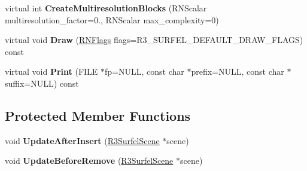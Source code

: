 \begin{DoxyCompactItemize}
\item 
virtual int {\bfseries Create\+Multiresolution\+Blocks} (R\+N\+Scalar multiresolution\+\_\+factor=0., R\+N\+Scalar max\+\_\+complexity=0)\hypertarget{class_r3_surfel_tree_a20392a96414cd9f14d7a0f4a10e325b6}{}\label{class_r3_surfel_tree_a20392a96414cd9f14d7a0f4a10e325b6}

\item 
virtual void {\bfseries Draw} (\hyperlink{class_r_n_flags}{R\+N\+Flags} flags=R3\+\_\+\+S\+U\+R\+F\+E\+L\+\_\+\+D\+E\+F\+A\+U\+L\+T\+\_\+\+D\+R\+A\+W\+\_\+\+F\+L\+A\+GS) const \hypertarget{class_r3_surfel_tree_a8f51db85191ff2292d5aaf42428029fb}{}\label{class_r3_surfel_tree_a8f51db85191ff2292d5aaf42428029fb}

\item 
virtual void {\bfseries Print} (F\+I\+LE $\ast$fp=N\+U\+LL, const char $\ast$prefix=N\+U\+LL, const char $\ast$suffix=N\+U\+LL) const \hypertarget{class_r3_surfel_tree_af72214b2fc4824eb9def832d88075ead}{}\label{class_r3_surfel_tree_af72214b2fc4824eb9def832d88075ead}

\end{DoxyCompactItemize}
\subsection*{Protected Member Functions}
\begin{DoxyCompactItemize}
\item 
void {\bfseries Update\+After\+Insert} (\hyperlink{class_r3_surfel_scene}{R3\+Surfel\+Scene} $\ast$scene)\hypertarget{class_r3_surfel_tree_af7fedd8d434370aa170fcd761e8bde7b}{}\label{class_r3_surfel_tree_af7fedd8d434370aa170fcd761e8bde7b}

\item 
void {\bfseries Update\+Before\+Remove} (\hyperlink{class_r3_surfel_scene}{R3\+Surfel\+Scene} $\ast$scene)\hypertarget{class_r3_surfel_tree_a7aba29374236a3268b170b067a719d6a}{}\label{class_r3_surfel_tree_a7aba29374236a3268b170b067a719d6a}

\end{DoxyCompactItemize}
